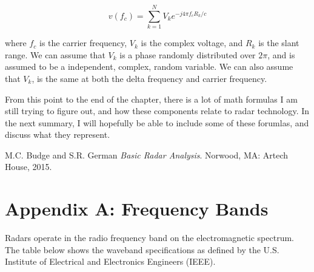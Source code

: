 \documentclass[12pt]{article}
\begin{document}
\begin{equation}
    v(f_c) = \sum_{k=1}^{N} V_k e^{-j4\pi f_c R_k / c}
\end{equation}

where $f_c$ is the carrier frequency, $V_k$ is the complex voltage, and $R_k$ is the slant range. We can assume that $V_k$ is a phase randomly distributed over $2\pi$, and is assumed to be a independent, complex, random variable. We can also assume that 
$V_k$, is the same at both the delta frequency and carrier frequency. 

From this point to the end of the chapter, there is a lot of math formulas I am still trying to figure out, and how these components relate to radar technology. In the next summary, I will hopefully be able to include some of these forumlas, and discuss what they represent.

\pagebreak
\begin{thebibliography}{9}
     M.C. Budge and S.R. German \textit{Basic Radar Analysis}. Norwood, MA: Artech House, 2015.
\end{thebibliography}

\pagebreak
\section{Appendix A: Frequency Bands}

Radars operate in the radio frequency band on the electromagnetic spectrum. The table below shows the waveband specifications as defined by the U.S. Institute of Electrical and Electronics Engineers (IEEE).
\end{document}
